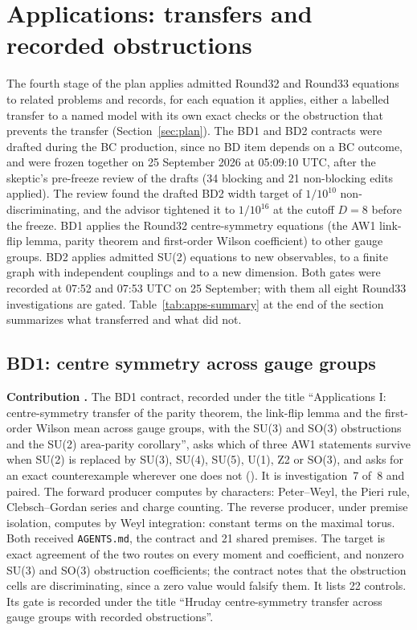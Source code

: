 \section{Applications: transfers and recorded obstructions}
\label{sec:apps}

The fourth stage of the plan applies admitted Round32 and Round33 equations
to related problems and records, for each equation it applies, either a
labelled transfer to a named model with its own exact checks or the
obstruction that prevents the transfer (Section~\ref{sec:plan}). The BD1 and
BD2 contracts were drafted during the BC production, since no BD item
depends on a BC outcome, and were frozen together on 25 September 2026 at
05:09:10 UTC, after the skeptic's pre-freeze review of the drafts (34 blocking
and 21 non-blocking edits applied). The review found the drafted BD2 width
target of $1/10^{10}$ non-discriminating, and the advisor tightened it to
$1/10^{16}$ at the cutoff $D=8$ before the freeze. BD1 applies the Round32
centre-symmetry equations (the AW1 link-flip lemma, parity theorem and
first-order Wilson coefficient) to other gauge groups. BD2 applies admitted
SU(2) equations to new observables, to a finite graph with independent
couplings and to a new dimension. Both gates were recorded at 07:52 and 07:53
UTC on 25 September; with them all eight Round33 investigations are gated.
Table~\ref{tab:apps-summary} at the end of the section summarizes what
transferred and what did not.

\subsection{BD1: centre symmetry across gauge groups}
\label{sec:bd1}

\textbf{Contribution .} The BD1 contract, recorded
under the title ``Applications I: centre-symmetry transfer of the parity
theorem, the link-flip lemma and the first-order Wilson mean across gauge
groups, with the SU(3) and SO(3) obstructions and the SU(2) area-parity
corollary'', asks which of three AW1 statements survive when SU(2) is
replaced by SU(3), SU(4), SU(5), U(1), Z2 or SO(3), and asks for an exact
counterexample wherever one does not
(). It is
investigation~7 of~8 and paired. The forward producer computes by
characters: Peter--Weyl, the Pieri rule, Clebsch--Gordan series and charge
counting. The reverse producer, under premise isolation, computes by Weyl
integration: constant terms on the maximal torus. Both received
\texttt{AGENTS.md}, the contract and 21 shared premises. The target is exact
agreement of the two routes on every moment and coefficient, and nonzero
SU(3) and SO(3) obstruction coefficients; the contract notes that the
obstruction cells are discriminating, since a zero value would falsify
them. It lists 22 controls. Its gate is recorded under the title ``Hruday
centre-symmetry transfer across gauge groups with recorded obstructions''.


